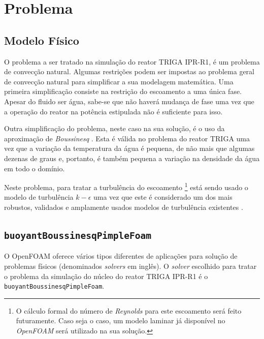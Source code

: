 \documentclass[12pt,openright,twoside,a4paper,english,french,spanish,brazil]{abntex2}
\begin{document}
\chapter{Problema}

\section{Modelo Físico}

O problema a ser tratado na simulação do reator TRIGA IPR-R1, é um problema de convecção natural.
Algumas restrições podem ser impostas ao problema geral de convecção natural para simplificar 
a sua modelagem matemática. Uma primeira simplificação consiste na restrição do escoamento a uma única fase. Apesar do fluido 
ser água, sabe-se que não haverá mudança de fase uma vez que a operação do reator na potência estipulada não é suficiente 
para isso.

Outra simplificação do problema, neste caso na sua solução, é o uso da aproximação de \textit{Boussinesq} \cite{Gray76}. 
Esta é válida no problema do reator TRIGA uma vez que a variação da temperatura da água é pequena, de não mais que algumas 
dezenas de graus e, portanto, é também pequena a variação na densidade da água em todo o domínio. 

Neste problema, para tratar a turbulência do escoamento  
\footnote{O cálculo formal do número de \textit{Reynolds} para este escoamento será feito futuramente. 
Caso seja o caso, um modelo laminar já disponível no \textit{OpenFOAM} será utilizado na sua solução.} 
está sendo usado o modelo de turbulência $k-\epsilon$ uma vez que este é considerado um dos mais robustos, 
validados e amplamente usados modelos de turbulência existentes \cite[p.~78]{Versteeg2007}. 


\section{\texttt{buoyantBoussinesqPimpleFoam}} 
\label{sec:solver}
O OpenFOAM oferece vários tipos diferentes de aplicações para solução de problemas 
físicos (denominados \textit{solvers} em inglês). O \textit{solver} escolhido para 
tratar o problema da simulação do núcleo do reator TRIGA IPR-R1 é o 
\texttt{buoyantBoussinesqPimpleFoam}. 
\end{document}
